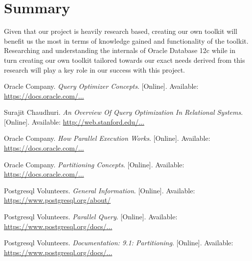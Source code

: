 \documentclass[draftclsnofoot, onecolumn, compsoc, 10pt]{IEEEtran}
\begin{document}
\section{Summary}


Given that our project is heavily research based, creating our own toolkit will benefit us the most in terms of knowledge gained and functionality of the toolkit. Researching and understanding the internals of Oracle Database 12c while in turn creating our own toolkit tailored towards our exact needs derived from this research will play a key role in our success with this project.


\begin{thebibliography}{9}
Oracle Company.
\textit{Query Optimizer Concepts}.
[Online].
Available: \href{https://docs.oracle.com/database/121/TGSQL/tgsql_optcncpt.htm#TGSQL192}{https://docs.oracle.com/...}
 
Surajit Chaudhuri.
\textit{An Overview Of Query Optimization In Relational Systems}.
[Online].
Available: \href{http://web.stanford.edu/class/cs345d-01/rl/chaudhuri98.pdf}{http://web.stanford.edu/...}

Oracle Company.
\textit{How Parallel Execution Works}.
[Online].
Available: \href{https://docs.oracle.com/cd/E11882_01/server.112/e25523/parallel002.htm}{https://docs.oracle.com/...}

Oracle Company.
\textit{Partitioning Concepts}.
[Online].
Available: \href{https://docs.oracle.com/cd/B28359_01/server.111/b32024/partition.htm}{https://docs.oracle.com/...}

Postgresql Volunteers.
\textit{General Information}.
[Online].
Available: \href{https://www.postgresql.org/about/}{https://www.postgresql.org/about/}

Postgresql Volunteers.
\textit{Parallel Query}.
[Online].
Available: \href{https://www.postgresql.org/docs/current/static/parallel-query.html}{https://www.postgresql.org/docs/...}

Postgresql Volunteers.
\textit{Documentation: 9.1: Partitioning}.
[Online].
Available: \href{https://www.postgresql.org/docs/9.1/static/ddl-partitioning.html}{https://www.postgresql.org/docs/...}


\end{thebibliography}
\end{document}
